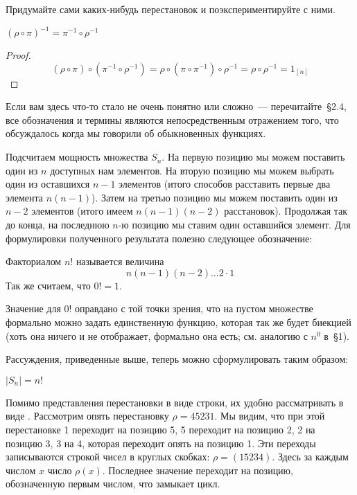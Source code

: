 \begin{exercise}
Придумайте сами каких-нибудь перестановок и поэкспериментируйте с ними.
\end{exercise}

\begin{thm}
$(\rho\circ\pi)^{-1} = \pi^{-1}\circ\rho^{-1}$
\end{thm}
\begin{proof}
$$(\rho\circ\pi)\circ(\pi^{-1}\circ\rho^{-1}) = \rho\circ(\pi\circ\pi^{-1})\circ\rho^{-1} = \rho\circ\rho^{-1} = 1_{[n]}$$
\end{proof}

Если вам здесь что-то стало не очень понятно или сложно~--- перечитайте~\S2.4, все обозначения и термины являются непосредственным отражением того, что обсуждалось когда мы говорили об обыкновенных функциях.

Подсчитаем мощность множества $S_n$. На первую позицию мы можем поставить один из $n$ доступных нам элементов. На вторую позицию мы можем выбрать один из оставшихся $n-1$ элементов (итого способов расставить первые два элемента $n(n-1)$). Затем на третью позицию мы можем поставить один из $n-2$ элементов (итого имеем $n(n-1)(n-2)$ расстановок). Продолжая так до конца, на последнюю $n$-ю позицию мы ставим один оставшийся элемент. Для формулировки полученного результата полезно следующее обозначение:

\begin{definition}
Факториалом $n!$ называется величина $$n(n-1)(n-2)\ldots 2\cdot 1$$
Так же считаем, что $0! = 1$.
\end{definition}

Значение для $0!$ оправдано с той точки зрения, что на пустом множестве формально можно задать единственную функцию, которая так же будет биекцией (хоть она ничего и не отображает, формально она есть; см. аналогию с $n^0$ в~\S1).

Рассуждения, приведенные выше, теперь можно сформулировать таким образом:

\begin{thm}
$|S_n| = n!$
\end{thm}

Помимо представления перестановки в виде строки, их удобно рассматривать в виде . Рассмотрим опять перестановку $\rho = 45231$. Мы видим, что при этой перестановке 1 переходит на позицию 5, 5 переходит на позицию 2, 2 на позицию 3, 3 на 4, которая переходит опять на позицию 1. Эти переходы записываются строкой чисел в круглых скобках: $\rho = (15234)$. Здесь за каждым числом $x$ число $\rho(x)$. Последнее значение переходит на позицию, обозначенную первым числом, что замыкает цикл.


